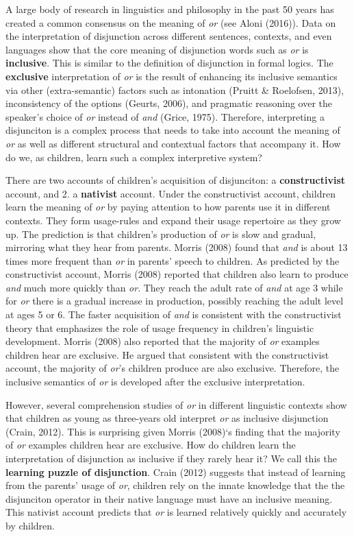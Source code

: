 \documentclass[10pt, letterpaper]{article}
\begin{document}
A large body of research in linguistics and philosophy in the past 50
years has created a common consensus on the meaning of \emph{or} (see
Aloni (2016)). Data on the interpretation of disjunction across
different sentences, contexts, and even languages show that the core
meaning of disjunction words such as \emph{or} is \textbf{inclusive}.
This is similar to the definition of disjunction in formal logics. The
\textbf{exclusive} interpretation of \emph{or} is the result of
enhancing its inclusive semantics via other (extra-semantic) factors
such as intonation (Pruitt \& Roelofsen, 2013), inconsistency of the
options (Geurts, 2006), and pragmatic reasoning over the speaker's
choice of \emph{or} instead of \emph{and} (Grice, 1975). Therefore,
interpreting a disjunciton is a complex process that needs to take into
account the meaning of \emph{or} as well as different structural and
contextual factors that accompany it. How do we, as children, learn such
a complex interpretive system?

There are two accounts of children's acquisition of disjunciton: a
\textbf{constructivist} account, and 2. a \textbf{nativist} account.
Under the constructivist account, children learn the meaning of
\emph{or} by paying attention to how parents use it in different
contexts. They form usage-rules and expand their usage repertoire as
they grow up. The prediction is that children's production of \emph{or}
is slow and gradual, mirroring what they hear from parents. Morris
(2008) found that \emph{and} is about 13 times more frequent than
\emph{or} in parents' speech to children. As predicted by the
constructivist account, Morris (2008) reported that children also learn
to produce \emph{and} much more quickly than \emph{or}. They reach the
adult rate of \emph{and} at age 3 while for \emph{or} there is a gradual
increase in production, possibly reaching the adult level at ages 5 or
6. The faster acquisition of \emph{and} is consistent with the
constructivist theory that emphasizes the role of usage frequency in
children's linguistic development. Morris (2008) also reported that the
majority of \emph{or} examples children hear are exclusive. He argued
that consistent with the constructivist account, the majority of
\emph{or}'s children produce are also exclusive. Therefore, the
inclusive semantics of \emph{or} is developed after the exclusive
interpretation.

However, several comprehension studies of \emph{or} in different
linguistic contexts show that children as young as three-years old
interpret \emph{or} as inclusive disjunction (Crain, 2012). This is
surprising given Morris (2008)`s finding that the majority of \emph{or}
examples children hear are exclusive. How do children learn the
interpretation of disjunction as inclusive if they rarely hear it? We
call this the \textbf{learning puzzle of disjunction}. Crain (2012)
suggests that instead of learning from the parents' usage of \emph{or},
children rely on the innate knowledge that the the disjunciton operator
in their native language must have an inclusive meaning. This nativist
account predicts that \emph{or} is learned relatively quickly and
accurately by children.
\end{document}
